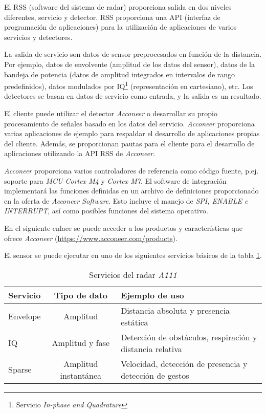 El RSS (software del sistema de radar) proporciona salida en dos niveles diferentes, servicio y detector. RSS proporciona una API (interfaz de programación de aplicaciones) para la utilización de aplicaciones de varios servicios y detectores.

La salida de servicio son datos de sensor preprocesados en función de la distancia. Por ejemplo, datos de envolvente (amplitud de los datos del sensor), datos de la bandeja de potencia (datos de amplitud integrados en intervalos de rango predefinidos), datos modulados por IQ\footnote{Servicio \textit{In-phase and Quadrature}} (representación en cartesiano), etc. Los detectores se basan en datos de servicio como entrada, y la salida es un resultado. 

El cliente puede utilizar el detector \textit{Acconeer} o desarrollar su propio procesamiento de señales basado en los datos del servicio.
\textit{Acconeer} proporciona varias aplicaciones de ejemplo para respaldar el desarrollo de aplicaciones propias del cliente. Además, se proporcionan pautas para el cliente para el desarrollo de aplicaciones utilizando la API RSS de \textit{Acconeer}.

\textit{Acconeer} proporciona varios controladores de referencia como código fuente, p.ej. soporte para \textit{MCU Cortex M4} y \textit{Cortex M7}.
El software de integración implementará las funciones definidas en un archivo de definiciones proporcionado en la oferta de \textit{Acconeer Software}. Esto incluye el manejo de \textit{SPI, ENABLE e INTERRUPT}, así como posibles funciones del sistema operativo.

En el siguiente enlace se puede acceder a los productos y características que ofrece \textit{Acconeer} (\url{https://www.acconeer.com/products}).

El sensor se puede ejecutar en uno de los siguientes servicios básicos de la tabla \ref{tab:serviciosa111}.

\begin{table}[h]
\begin{center}
\begin{tabular}{| l | c | p{7cm} |}
\hline
\textbf{Servicio} & \textbf{Tipo de dato} & \textbf{Ejemplo de uso} \\ \hline
Envelope & Amplitud & Distancia absoluta y presencia estática \\ \hline
IQ & Amplitud y fase & Detección de obstáculos, respiración y distancia relativa \\ \hline
Sparse & Amplitud instantánea & Velocidad, detección de presencia y detección de gestos \\ \hline
\end{tabular}
\caption{Servicios del radar \textit{A111}}
\label{tab:serviciosa111}
\end{center}
\end{table}



